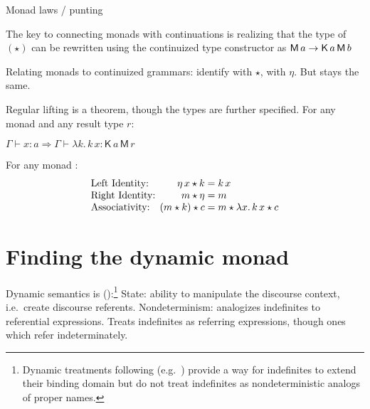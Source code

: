 	Monad laws / punting
	\begin{defi}
	\end{defi}
	
	The key to connecting monads with continuations is realizing that the type of $(\star)$ can be rewritten using the continuized type constructor as $\textsf{M}\,a \rightarrow \textsf{K}\,a\,\textsf{M}\,b$%

	Relating monads to continuized grammars: identify  with $\star$,  with $\eta$. But  stays the same.%
	
	Regular lifting is a theorem, though the types are further specified. For any monad  and any result type $r$:%
	\begin{fact}
		$\Gamma \vdash x : a \Rightarrow \Gamma \vdash \lambda k.\,k\,x : \textsf{K}\,a\,\textsf{M}\,r$%
	\end{fact}
	\begin{fact}For any monad :
		\[\begin{array}{l@{}r@{}l}
			\text{Left Identity: }&\eta\,x \star k &{}= k\,x
			\\
			\text{Right Identity: }&m \star \eta &{}= m
			\\
			\text{Associativity: }&(m \star k) \star c &{}= m \star \lambda x.\,k\,x \star c%
		\end{array}\]
	\end{fact}

\section{Finding the dynamic monad}
	Dynamic semantics is (\citealt{Shan:2001}):\footnote{Dynamic treatments following \citealt{GroenendijkStokhof:1990} (e.g.~\citealt{Zimmermann:1991, Dekker:1993, Szabolcsi:2003, Groote:2006}) provide a way for indefinites to extend their binding domain but do not treat indefinites as nondeterministic analogs of proper names.}%
		State: ability to manipulate the discourse context, i.e.~create discourse referents. %
		Nondeterminism: analogizes indefinites to referential expressions. Treats indefinites as referring expressions, though ones which refer indeterminately.%
	
